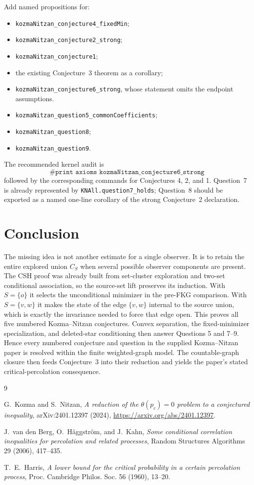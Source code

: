 \documentclass[11pt]{article}
\theoremstyle{definition}
\theoremstyle{remark}
\newcommand{\lean}[1]{\texttt{#1}}
\begin{document}
Add named propositions for:
\begin{itemize}
\item \lean{kozmaNitzan\_conjecture4\_fixedMin};
\item \lean{kozmaNitzan\_conjecture2\_strong};
\item \lean{kozmaNitzan\_conjecture1};
\item the existing Conjecture~3 theorem as a corollary;
\item \lean{kozmaNitzan\_conjecture6\_strong}, whose statement omits the
  endpoint assumptions.
\item \lean{kozmaNitzan\_question5\_commonCoefficients};
\item \lean{kozmaNitzan\_question8};
\item \lean{kozmaNitzan\_question9}.
\end{itemize}

The recommended kernel audit is
\[
 \lean{\#print\ axioms kozmaNitzan\_conjecture6\_strong}
\]
followed by the corresponding commands for Conjectures 4, 2, and 1.
Question~7 is already represented by \lean{KNAll.question7\_holds};
Question~8 should be exported as a named one-line corollary of the
strong Conjecture~2 declaration.

\section{Conclusion}

The missing idea is not another estimate for a single observer.  It is to
retain the entire explored union $C_S$ when several possible observer
components are present.  The CSH proof was already built from set-cluster
exploration and two-set conditional association, so the source-set lift
preserves its induction.  With $S=\{o\}$ it selects the unconditional
minimizer in the pre-FKG comparison.  With $S=\{v,w\}$ it makes the state
of the edge $\{v,w\}$ internal to the source union, which is exactly the
invariance needed to force that edge open.  This proves all five numbered
Kozma--Nitzan conjectures.  Convex separation, the fixed-minimizer
specialization, and deleted-star conditioning then answer Questions
5 and 7--9.  Hence every numbered conjecture and question in the supplied
Kozma--Nitzan paper is resolved within the finite weighted-graph model.
The countable-graph closure then feeds Conjecture~3 into their reduction
and yields the paper's stated critical-percolation consequence.

\begin{thebibliography}{9}

G.~Kozma and S.~Nitzan,
\emph{A reduction of the $\theta(p_c)=0$ problem to a conjectured
inequality}, arXiv:2401.12397 (2024),
\url{https://arxiv.org/abs/2401.12397}.

J.~van den Berg, O.~H\"aggstr\"om, and J.~Kahn,
\emph{Some conditional correlation inequalities for percolation and
related processes}, Random Structures Algorithms 29 (2006), 417--435.

T.~E.~Harris,
\emph{A lower bound for the critical probability in a certain
percolation process}, Proc. Cambridge Philos. Soc. 56 (1960), 13--20.

\end{thebibliography}
\end{document}
